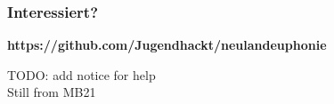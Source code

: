 \documentclass [xcolor=dvipsnames] {beamer}
\begin{document}
\begin{frame}
	\frametitle{\sc Interessiert?}
	\begin{center}
		{\bf https://github.com/Jugendhackt/neulandeuphonie}
	\end{center}
\end{frame}
\note
{
	{\Large TODO: add notice for help}
	\\
	Still from MB21
}

\begin{frame}
	\titlepage
\end{frame}
\end{document}
